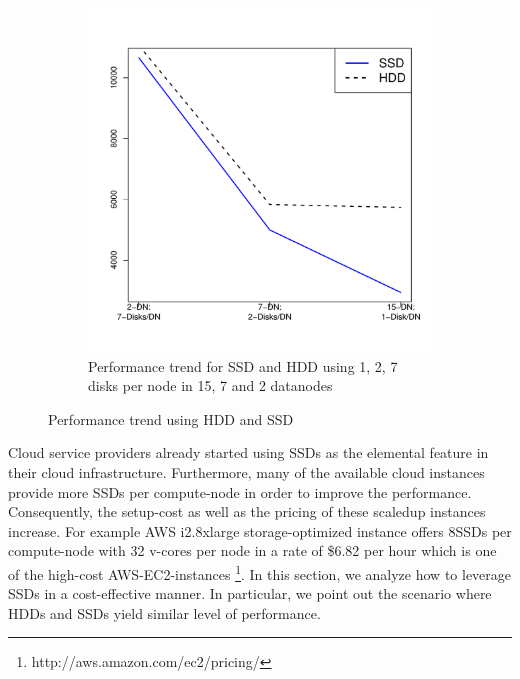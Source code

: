 \documentclass[conference]{IEEEtran}
\begin{document}
\begin{figure}[h]
\begin{subfigure}[b]{0.23\textwidth}
          \includegraphics[width=\textwidth]{Figure/PerormanceData/Plots/SSDHDDDiffNode.pdf}
          \caption{Performance trend for SSD and HDD using 1, 2, 7 disks per node in 15, 7 and 2 datanodes}
          \label{fig:SsdNHddDiffNodes}
  \end{subfigure}
  \caption{Performance trend using HDD and SSD}
  \label{fig:SsdNHdd}
\end{figure}
Cloud service providers already started using SSDs as the elemental feature in their cloud infrastructure.
Furthermore, many of the available cloud instances provide more SSDs per compute-node in order to improve the performance.
Consequently, the setup-cost as well as the pricing of these scaledup instances increase.
For example AWS i2.8xlarge storage-optimized instance offers 8SSDs per compute-node with 32 v-cores per node in a rate of \$6.82 per hour which is one of the high-cost AWS-EC2-instances \footnote{http://aws.amazon.com/ec2/pricing/}.
In this section, we analyze how to leverage SSDs in a cost-effective manner.
In particular, we point out the scenario where HDDs and SSDs yield similar level of performance.
\end{document}
